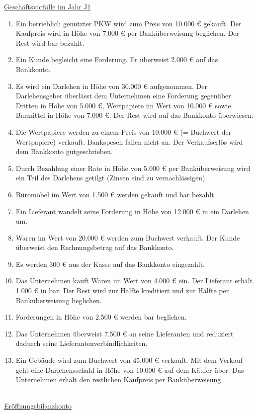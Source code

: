 \documentclass[paper=a4, fontsize=11pt]{scrartcl}
\numberwithin{equation}{section}
\numberwithin{figure}{section}
\numberwithin{table}{section}
\begin{document}
\underline{Geschäftsvorfälle im Jahr J1}

 \begin{enumerate}
 \item Ein betrieblich genutzter PKW wird zum Preis von 10.000 € gekauft. Der Kaufpreis wird in Höhe von 7.000 € per Banküberweisung beglichen. Der Rest wird bar bezahlt.
 \item Ein Kunde begleicht eine Forderung. Er überweist 2.000 € auf das Bankkonto. 
 \item Es wird ein Darlehen in Höhe von 30.000 € aufgenommen. Der Darlehensgeber überlässt dem Unternehmen eine Forderung gegenüber Dritten in Höhe von 5.000 €, Wertpapiere im Wert von 10.000 € sowie Barmittel in Höhe von 7.000 €. Der Rest wird auf das Bankkonto überwiesen.
 \item Die Wertpapiere werden zu einem Preis von 10.000 € (= Buchwert der Wertpapiere) verkauft. Bankspesen fallen nicht an. Der Verkaufserlös wird dem Bankkonto gutgeschrieben.
 \item Durch Bezahlung einer Rate in Höhe von 5.000 € per Banküberweisung wird ein Teil des Darlehens getilgt (Zinsen sind zu vernachlässigen).
 \item Büromöbel im Wert von 1.500 € werden gekauft und bar bezahlt.
 \item Ein Lieferant wandelt seine Forderung in Höhe von 12.000 € in ein Darlehen um.
 \item Waren im Wert von 20.000 € werden zum Buchwert verkauft. Der Kunde überweist den Rechnungsbetrag auf das Bankkonto.
 \item Es werden 300 € aus der Kasse auf das Bankkonto eingezahlt.
 \item Das Unternehmen kauft Waren im Wert von 4.000 € ein. Der Lieferant erhält 1.000 € in bar. Der Rest wird zur Hälfte kreditiert und zur Hälfte per Banküberweisung beglichen.
 \item Forderungen in Höhe von 2.500 € werden bar beglichen.
 \item Das Unternehmen überweist 7.500 € an seine Lieferanten und reduziert dadurch seine Lieferantenverbindlichkeiten.
 \item Ein Gebäude wird zum Buchwert von 45.000 € verkauft. Mit dem Verkauf geht eine Darlehensschuld in Höhe von 10.000 € auf dem Käufer über. Das Unternehmen erhält den restlichen Kaufpreis per Banküberweisung.
 \end{enumerate}
\\

\underline{Eröffnungsbilanzkonto}
\end{document}
